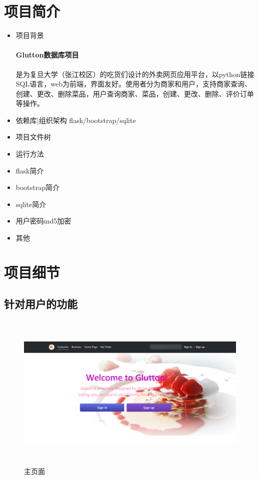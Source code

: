 \documentclass[12pt, oneside,a4paper]{article}
\begin{document}
\section{项目简介}
 \begin{itemize}
  \item 项目背景
  \paragraph {Glutton数据库项目} 是为复旦大学（张江校区）的吃货们设计的外卖网页应用平台，以python链接SQL语言，web为前端，界面友好。使用者分为商家和用户，支持商家查询、创建、更改、删除菜品，用户查询商家、菜品，创建、更改、删除、评价订单等操作。
  \item 依赖库|组织架构
   flask/bootstrap/sqlite
  \item 项目文件树
  \item 运行方法
  \item flask简介
  \item bootstrap简介
  \item sqlite简介
  \item 用户密码md5加密
  \item 其他
 \end{itemize}

\section{项目细节}

 \subsection{针对用户的功能}
 \begin{figure}[H]
   \centering
     \includegraphics[width=6.00in,height=3.00in]{customer.png}
     \caption{\small{主页面}}\label{fig:dummy}
  \end{figure}
  
\end{document}
